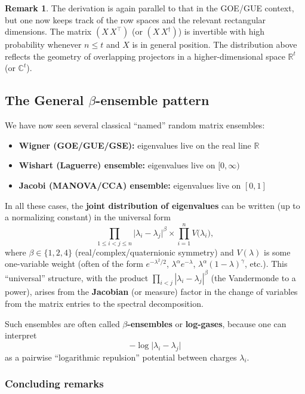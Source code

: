 \documentclass[letterpaper,11pt,oneside,reqno]{article}
\numberwithin{equation}{section}
\theoremstyle{definition}
\newtheorem{remark}[proposition]{Remark}
\begin{document}
\begin{remark}
The derivation is again parallel to that in the GOE/GUE context, but one now keeps track of the row spaces and the relevant rectangular dimensions.  The matrix \((X\,X^\top)\) (or \((X\,X^\dagger)\)) is invertible with high probability whenever \(n\le t\) and \(X\) is in general position.  The distribution above reflects the geometry of overlapping projectors in a higher-dimensional space \(\mathbb{R}^t\) (or \(\mathbb{C}^t\)).
\end{remark}






\subsection{The General $\beta$-ensemble pattern}
\label{sec:general-beta-pattern}

We have now seen several classical ``named'' random matrix ensembles:
\begin{itemize}
    \item \textbf{Wigner (GOE/GUE/GSE):} eigenvalues live on the real line $\mathbb{R}$
    \item \textbf{Wishart (Laguerre) ensemble:} eigenvalues live on $[0,\infty)$
    \item \textbf{Jacobi (MANOVA/CCA) ensemble:} eigenvalues live on $[0,1]$
\end{itemize}

In all these cases, the \textbf{joint distribution of eigenvalues} can be written (up to a normalizing constant) in the universal form
\[
    \prod_{1\leq i<j\leq n}
    \!\bigl|\lambda_i-\lambda_j\bigr|^\beta
    \times
    \prod_{i=1}^n
    V\bigl(\lambda_i\bigr),
\]
where $\beta\in\{1,2,4\}$ (real/complex/quaternionic symmetry) and $V(\lambda)$ is some one-variable weight (often of the form $e^{-\lambda^2/2}$, $\lambda^\alpha e^{-\lambda}$, $\lambda^\alpha (1-\lambda)^\gamma$, etc.). This ``universal'' structure, with the product
$\prod_{i<j}|\lambda_i-\lambda_j|^\beta$ (the Vandermonde to a power), arises from the \textbf{Jacobian} (or measure) factor in the change of variables from the matrix entries to the spectral decomposition.

Such ensembles are often called \textbf{$\beta$-ensembles} or \textbf{log-gases}, because one can interpret
\[
    -\log\bigl|\lambda_i-\lambda_j\bigr|
\]
as a pairwise ``logarithmic repulsion'' potential between charges $\lambda_i$.

\subsubsection{Concluding remarks}
\end{document}
